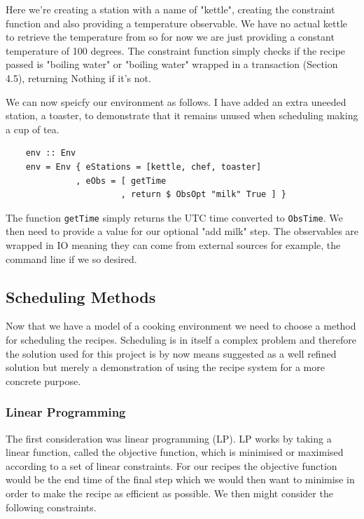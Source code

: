 \documentclass[11pt]{article}
\begin{document}
Here we're creating a station with a name of "kettle", creating the constraint function
and also providing a temperature observable. We have no actual kettle to retrieve the temperature
from so for now we are just providing a constant temperature of 100 degrees. The constraint function
simply checks if the recipe passed is "boiling water" or "boiling water" wrapped in a transaction (Section 4.5),
returning Nothing if it's not.

\medbreak

We can now speicfy our environment as follows. I have added an extra uneeded station, a toaster,
to demonstrate that it remains unused when scheduling making a cup of tea.

\begin{lstlisting}
    env :: Env
    env = Env { eStations = [kettle, chef, toaster]
              , eObs = [ getTime
                       , return $ ObsOpt "milk" True ] }
\end{lstlisting}

The function \texttt{getTime} simply returns the UTC time converted to \texttt{ObsTime}.
We then need to provide a value for our optional "add milk" step. The observables are
wrapped in IO meaning they can come from external sources for example, the command line
if we so desired.

\subsection{Scheduling Methods}

Now that we have a model of a cooking environment we need to choose a method for scheduling the recipes.
Scheduling is in itself a complex problem and therefore the solution used for this project is by
now means suggested as a well refined solution but merely a demonstration of using the recipe system
for a more concrete purpose.

\subsubsection{Linear Programming}
The first consideration was linear programming (LP). LP works by taking a linear function, called
the objective function, which is minimised or maximised according to a set of linear constraints.
For our recipes the objective function would be the end time of the final step which we would then
want to minimise in order to make the recipe as efficient as possible. We then might consider the
following constraints.
\end{document}

